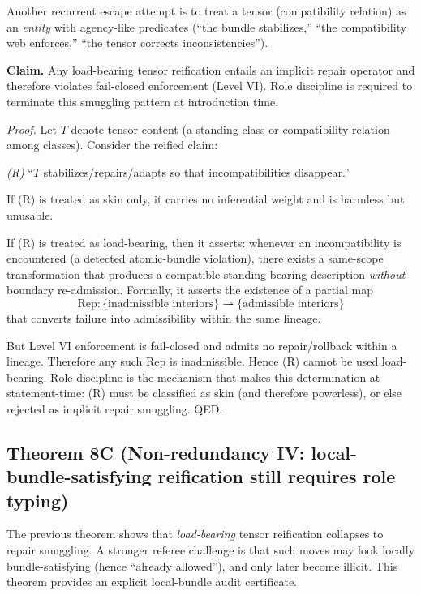 \documentclass[12pt]{article}
\theoremstyle{plain}
\begin{document}
Another recurrent escape attempt is to treat a tensor (compatibility relation) as an \emph{entity} with agency-like predicates (``the bundle stabilizes,'' ``the compatibility web enforces,'' ``the tensor corrects inconsistencies'').

\medskip

\noindent\textbf{Claim.} Any load-bearing tensor reification entails an implicit repair operator and therefore violates fail-closed enforcement (Level VI). Role discipline is required to terminate this smuggling pattern at introduction time.

\textit{Proof.} Let $T$ denote tensor content (a standing class or compatibility relation among classes). Consider the reified claim:

\medskip
\centerline{\emph{(R)} ``$T$ stabilizes/repairs/adapts so that incompatibilities disappear.''}
\medskip

If (R) is treated as skin only, it carries no inferential weight and is harmless but unusable.

If (R) is treated as load-bearing, then it asserts: whenever an incompatibility is encountered (a detected atomic-bundle violation), there exists a same-scope transformation that produces a compatible standing-bearing description \emph{without} boundary re-admission. Formally, it asserts the existence of a partial map
\[
\mathrm{Rep}:\{\text{inadmissible interiors}\}\rightharpoonup \{\text{admissible interiors}\}
\]
that converts failure into admissibility within the same lineage.

But Level VI enforcement is fail-closed and admits no repair/rollback within a lineage. Therefore any such $\mathrm{Rep}$ is inadmissible. Hence (R) cannot be used load-bearing. Role discipline is the mechanism that makes this determination at statement-time: (R) must be classified as skin (and therefore powerless), or else rejected as implicit repair smuggling. QED.


\subsection{Theorem 8C (Non-redundancy IV: local-bundle-satisfying reification still requires role typing)}

The previous theorem shows that \emph{load-bearing} tensor reification collapses to repair smuggling. A stronger referee challenge is that such moves may look locally bundle-satisfying (hence ``already allowed''), and only later become illicit. This theorem provides an explicit local-bundle audit certificate.
\end{document}
